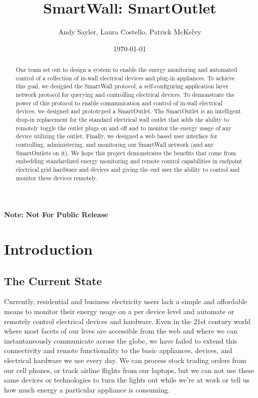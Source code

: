 \documentclass[11pt]{article}
\title{SmartWall: SmartOutlet}
\author{Andy Sayler, Laura Costello, Patrick McKelvy}
\date{\today}
\begin{document}
\maketitle
    
\begin{abstract}

Our team set out to design a system to enable the energy monitoring and
automated control of a collection of in-wall electrical devices and plug-in
appliances. To achieve this goal, we designed the SmartWall protocol,
a self-configuring application layer network protocol for querying and
controlling electrical devices. To demonstrate the power of this protocol
to enable communication and control of in-wall electrical devices, we
designed and prototyped a SmartOutlet. The SmartOutlet is an
intelligent drop-in
replacement for the standard electrical wall outlet that adds the
ability to remotely toggle the outlet plugs on and off and to monitor the
energy usage of any device utilizing the outlet. Finally, we designed a
web based user interface for controlling, administering, and
monitoring our SmartWall network (and any SmartOutlets on it). We hope
this project demonstrates the benefits that come from embedding
standardized energy monitoring and remote control capabilities in
endpoint electrical grid hardware and devices and giving the end user
the ability to control and monitor these devices remotely.
  
\end{abstract}

\begin{center} {\bf Note: Not For Public Release} \end{center}

\pagebreak

\tableofcontents

\pagebreak

\section{Introduction}

\subsection{The Current State}
Currently, residential and business electricity users lack a simple
and affordable means to monitor their energy usage on a per device
level and automate or remotely control electrical devices and
hardware. Even in the 21st century world where most facets of our
lives are accessible from the web and where we can instantaneously
communicate across the globe, we have failed to extend this
connectivity and remote functionality to the basic appliances, devices,
and electrical hardware we use every day. We can process stock trading
orders from our cell phones, or track airline flights from our
laptops, but we can not use these same devices or technologies to turn
the lights out while we're at work or tell us how much energy a
particular appliance is consuming.
\end{document}
